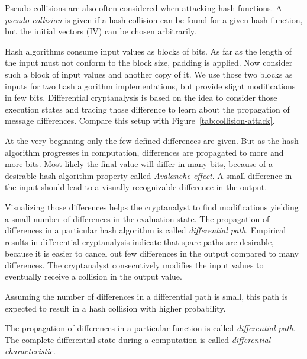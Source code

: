 Pseudo-collisions are also often considered when attacking hash functions.
A \emph{pseudo collision} is given if a hash collision can be found for a given
hash function, but the initial vectors (IV) can be chosen arbitrarily.

Hash algorithms consume input values as blocks of bits.
As far as the length of the input must not conform to the block size,
padding is applied. Now consider such a block of input values
and another copy of it. We use those two blocks as inputs for two
hash algorithm implementations, but provide slight modifications in few bits.
Differential cryptanalysis is based on the idea to consider those execution states
and tracing those difference to learn about the propagation of message differences.
Compare this setup with Figure~\ref{tab:collision-attack}.

At the very beginning only the few defined differences are given. But as the
hash algorithm progresses in computation, differences are propagated to more
and more bits. Most likely the final value will differ in many bits, because
of a desirable hash algorithm property called \emph{Avalanche effect}.
A small difference in the input should lead to a visually recognizable
difference in the output.

Visualizing those differences helps the cryptanalyst to find modifications
yielding a small number of differences in the evaluation state. The propagation
of differences in a particular hash algorithm is called \emph{differential
path}. Empirical results in differential cryptanalysis indicate that spare
paths are desirable, because it is easier to cancel out few differences in the
output compared to many differences.
The cryptanalyst consecutively modifies the input values to eventually
receive a collision in the output value.

\begin{theorem}
  Assuming the number of differences in a differential path is small,
  this path is expected to result in a hash collision with higher probability.
\end{theorem}

\begin{defi}
  The propagation of differences in a particular function is called
  \emph{differential path}. The complete differential state during
  a computation is called \emph{differential characteristic}.
\end{defi}

